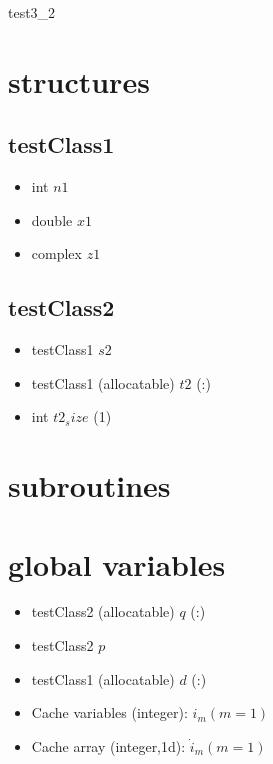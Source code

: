 \documentclass[a4paper,fleqn]{ltjsarticle}
\begin{document}
{\Large test3\_2}
\section{structures}
\subsection{testClass1}
\begin{itemize}
  \item int $n1$
  \item double $x1$
  \item complex $z1$
\end{itemize}
\subsection{testClass2}
\begin{itemize}
  \item testClass1 $s2$
  \item testClass1 (allocatable) $t2$ (:)
  \item int $t2_size$ (1)
\end{itemize}
\section{subroutines}
\section{global variables}
\begin{itemize}
\item testClass2 (allocatable) $q$ (:)
\item testClass2 $p$
\item testClass1 (allocatable) $d$ (:)
\item Cache variables (integer): \(i_m (m = 1)\)
\item Cache array (integer,1d): \(\dot{i}_m (m = 1)\)
\end{itemize}
\end{document}
